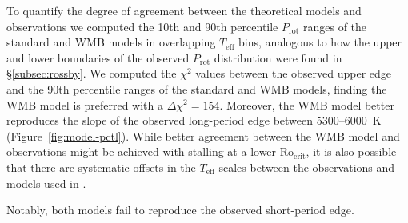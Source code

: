 \documentclass[twocolumn]{aastex631}
\newcommand{\rocrit}{$\mathrm{Ro_{crit}}$\xspace}
\newcommand{\teff}{\ensuremath{T_{\mathrm{eff}}}\xspace}
\newcommand{\prot}{\ensuremath{P_\mathrm{rot}}\xspace}
\begin{document}
To quantify the degree of agreement between the theoretical models and observations we computed the 10th and 90th percentile \prot ranges of the standard and WMB models in overlapping \teff bins, analogous to how the upper and lower boundaries of the observed \prot distribution were found in \S\ref{subsec:rossby}. We computed the $\chi^2$ values between the observed upper edge and the 90th percentile ranges of the standard and WMB models, finding the WMB model is preferred with a $\Delta \chi^2 = 154$. Moreover, the WMB model better reproduces the slope of the observed long-period edge between 5300--6000~K (Figure~\ref{fig:model-pctl}). While better agreement between the WMB model and observations might be achieved with stalling at a lower \rocrit, it is also possible that there are systematic offsets in the \teff scales between the observations and models used in \citet{vanSaders2019}. 

Notably, both models fail to reproduce the observed short-period edge. 


\iffalse
\begin{figure*}
    \centering
    \texttt{[image: std-model-cks.pdf]}
    \texttt{[image: wmb-model-cks.pdf]}
    \texttt{[image: std-model-lamost.pdf]}
    \texttt{[image: wmb-model-lamost.pdf]}
    \caption{The \teff-\prot plane for the CKS sample (top panels) and LAMOST sample (bottom panels) in comparison to the standard and WMB models presented in \citet{vanSaders2019}.}
    \label{fig:models}
\end{figure*}
\fi 


\iffalse
\begin{figure}
    \centering
    \texttt{[image: model-pctl.pdf]}
    \caption{Comparison of the 10th and 90th \prot percentiles predicted from the standard (light blue) and WMB (blue) models of \citet{vanSaders2019} with the same percentile ranges from the LAMOST--Kepler observations.}
    \label{fig:model-pctl}
\end{figure}
\fi 



\end{document}
